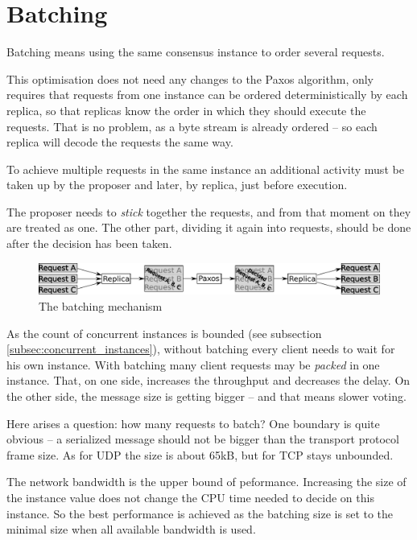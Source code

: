 \section{Batching}
\label{sec:batching}
Batching means using the same consensus instance to order several requests.

This optimisation does not need any changes to the Paxos algorithm, only requires that requests from one instance can be ordered deterministically by each replica, so that replicas know the order in which they should execute the requests. That is no problem, as a byte stream is already ordered -- so each replica will decode the requests the same way.

To achieve multiple requests in the same instance an additional activity must be taken up by the proposer and later, by replica, just before execution.

The proposer needs to \textit{stick} together the requests, and from that moment on they are treated as one. The other part, dividing it again into requests, should be done after the decision has been taken.
\begin{figure}[h]
\includegraphics[keepaspectratio, width=\textwidth]{features/batching.pdf}
\vspace{-1em}
\caption{The batching mechanism}
\vspace{-1em}
\end{figure}

As the count of concurrent instances is bounded (see subsection \ref{subsec:concurrent_instances}), without batching every client needs to wait for his own instance. With batching many client requests may be \textit{packed} in one instance. That, on one side, increases the throughput and decreases the delay.
On the other side, the message size is getting bigger -- and that means slower voting.

Here arises a question: how many requests to batch? One boundary is quite obvious -- a serialized message should not be bigger than the transport protocol frame size. As for UDP the size is about 65kB, but for TCP stays unbounded.

The network bandwidth is the upper bound of peformance. Increasing the size of the instance value does not change the CPU time needed to decide on this instance. So the best performance is achieved as the batching size is set to the minimal size when all available bandwidth is used.

